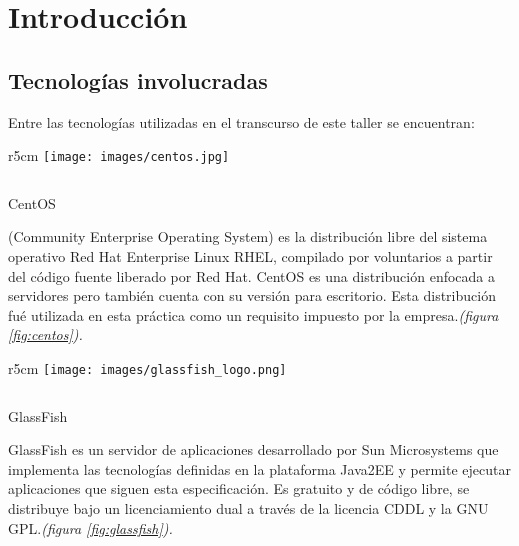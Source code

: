 \chapter{Introducción}

\section{Tecnologías involucradas}

Entre las tecnologías utilizadas en el transcurso de este taller se encuentran:
\newline
\newline

\begin{wrapfigure}{r}{5cm}
\texttt{[image: images/centos.jpg]}
\caption{CentOS.}
\label {fig:centos}
\vspace{1cm}
\end{wrapfigure}
$ $ 
\vspace{-1.5cm}

\begin{description}
\item CentOS

(Community Enterprise Operating System) es la distribución libre del sistema operativo  Red Hat Enterprise Linux RHEL, compilado por voluntarios a partir del código fuente liberado por Red Hat. CentOS es una distribución enfocada a servidores pero también cuenta con su versión para escritorio. Esta distribución fué utilizada en esta práctica como un requisito impuesto por la empresa.\emph{(figura \ref{fig:centos}).}
\end{description}




\begin{wrapfigure}{r}{5cm}
\texttt{[image: images/glassfish\_logo.png]}
\caption{GlassFish.}
\label {fig:glassfish}

\end{wrapfigure}
$ $ 
\vspace{-0.5cm}
\newline

\begin{description}
\item GlassFish

GlassFish es un servidor de aplicaciones desarrollado por Sun Microsystems que implementa las tecnologías definidas en la plataforma Java2EE y permite ejecutar aplicaciones que siguen esta especificación. Es gratuito y de código libre, se distribuye bajo un licenciamiento dual a través de la licencia CDDL y la GNU GPL.\emph{(figura \ref{fig:glassfish}).}
\end{description}


